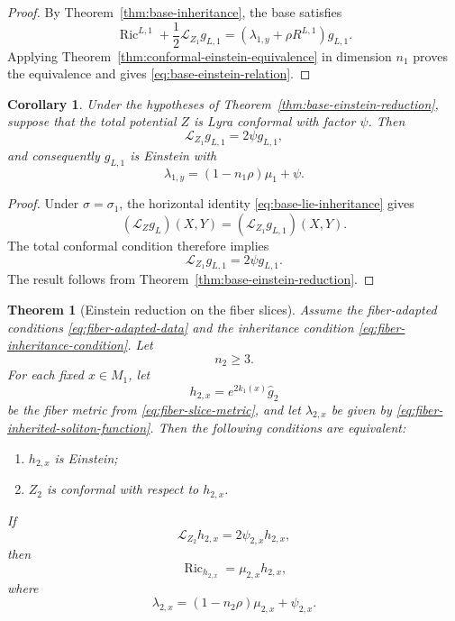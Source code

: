 \documentclass[a4paper,11pt]{article}
\theoremstyle{plain}
\newtheorem{theorem}{Theorem}[section]
\newtheorem{corollary} {Corollary}[section]
\numberwithin{equation}{section}
\begin{document}
\begin{proof}
	By Theorem~\ref{thm:base-inheritance}, the base satisfies
	\[
	\operatorname{Ric}^{L,1}
	+
	\frac12
	\mathcal L_{Z_{1}}g_{L,1}
	=
	\left(
	\lambda_{1,y}
	+
	\rho R^{L,1}
	\right)g_{L,1}.
	\]
	Applying
	Theorem~\ref{thm:conformal-einstein-equivalence} in dimension
	\(n_{1}\) proves the equivalence and gives
	\eqref{eq:base-einstein-relation}.
\end{proof}

\begin{corollary}
	\label{cor:total-conformal-base-einstein}
	Under the hypotheses of
	Theorem~\ref{thm:base-einstein-reduction}, suppose that the
	total potential \(Z\) is Lyra conformal with factor \(\psi\).
	Then
	\[
	\mathcal L_{Z_{1}}g_{L,1}
	=
	2\psi g_{L,1},
	\]
	and consequently \(g_{L,1}\) is Einstein with
	\begin{equation}
		\lambda_{1,y}
		=
		(1-n_{1}\rho)\mu_{1}
		+
		\psi.
		\label{eq:base-total-conformal-relation}
	\end{equation}
\end{corollary}

\begin{proof}
	Under \(\sigma=\sigma_{1}\), the horizontal identity
	\eqref{eq:base-lie-inheritance} gives
	\[
	(\mathcal L_{Z}g_{L})(X,Y)
	=
	(\mathcal L_{Z_{1}}g_{L,1})(X,Y).
	\]
	The total conformal condition therefore implies
	\[
	\mathcal L_{Z_{1}}g_{L,1}
	=
	2\psi g_{L,1}.
	\]
	The result follows from
	Theorem~\ref{thm:base-einstein-reduction}.
\end{proof}

\begin{theorem}[Einstein reduction on the fiber slices]
	\label{thm:fiber-einstein-reduction}
	Assume the fiber-adapted conditions
	\eqref{eq:fiber-adapted-data} and the inheritance condition
	\eqref{eq:fiber-inheritance-condition}. Let
	\[
	n_{2}\geq3.
	\]
	For each fixed \(x\in M_{1}\), let
	\[
	h_{2,x}
	=
	e^{2k_{1}(x)}\widehat g_{2}
	\]
	be the fiber metric from
	\eqref{eq:fiber-slice-metric}, and let
	\(\lambda_{2,x}\) be given by
	\eqref{eq:fiber-inherited-soliton-function}. Then the following
	conditions are equivalent:
	\begin{enumerate}
		\item \(h_{2,x}\) is Einstein;
		\item \(Z_{2}\) is conformal with respect to \(h_{2,x}\).
	\end{enumerate}
	
	If
	\begin{equation}
		\mathcal L_{Z_{2}}h_{2,x}
		=
		2\psi_{2,x}h_{2,x},
		\label{eq:fiber-slice-conformal-field}
	\end{equation}
	then
	\begin{equation}
		\operatorname{Ric}_{h_{2,x}}
		=
		\mu_{2,x}h_{2,x},
		\label{eq:fiber-slice-einstein}
	\end{equation}
	where
	\begin{equation}
		\lambda_{2,x}
		=
		(1-n_{2}\rho)\mu_{2,x}
		+
		\psi_{2,x}.
		\label{eq:fiber-einstein-relation}
	\end{equation}
\end{theorem}
\end{document}

